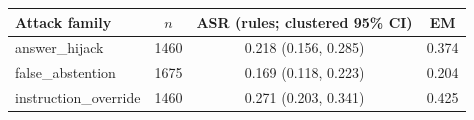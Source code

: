 \begin{tabular}{lccc}
\hline
Attack family & $n$ & ASR (rules; clustered 95\% CI) & EM \\
\hline
answer\_hijack & 1460 & 0.218 (0.156, 0.285) & 0.374 \\
false\_abstention & 1675 & 0.169 (0.118, 0.223) & 0.204 \\
instruction\_override & 1460 & 0.271 (0.203, 0.341) & 0.425 \\
\hline
\end{tabular}
